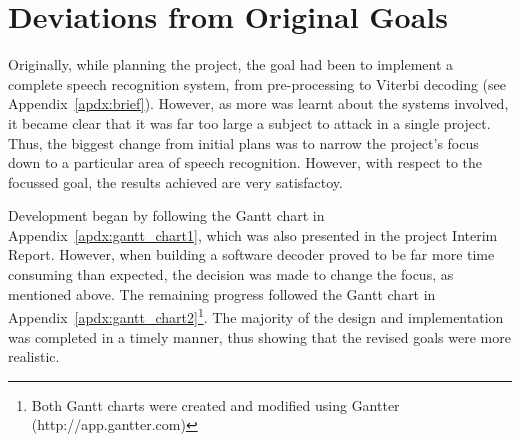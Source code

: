 \section{Deviations from Original Goals} %
\label{sec:deviations_from_original_goals}
	Originally, while planning the project, the goal had been to implement a complete speech recognition system, from pre-processing to Viterbi decoding (see Appendix~\ref{apdx:brief}).  However, as more was learnt about the systems involved, it became clear that it was far too large a subject to attack in a single project.  Thus, the biggest change from initial plans was to narrow the project's focus down to a particular area of speech recognition.  However, with respect to the focussed goal, the results achieved are very satisfactoy.

	Development began by following the Gantt chart in Appendix~\ref{apdx:gantt_chart1}, which was also presented in the project Interim Report.  However, when building a software decoder proved to be far more time consuming than expected, the decision was made to change the focus, as mentioned above.  
	The remaining progress followed the Gantt chart in Appendix~\ref{apdx:gantt_chart2}\footnote{Both Gantt charts were created and modified using Gantter (http://app.gantter.com)}.  The majority of the design and implementation was completed in a timely manner, thus showing that the revised goals were more realistic.



